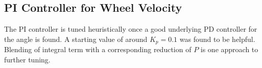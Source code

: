 \documentclass[11pt]{article}
\begin{document}
\subsection{PI Controller for Wheel Velocity}

The PI controller is tuned heuristically once a good underlying PD controller for the angle is found. A starting value of around $K_p = 0.1$ was found to be helpful. Blending of integral term with a corresponding reduction of $P$ is one approach to further tuning.











 
\end{document}
